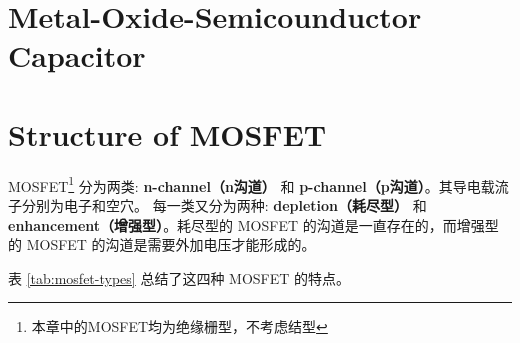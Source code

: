 \section[MOS]{Metal-Oxide-Semicounductor Capacitor}

\section{Structure of MOSFET}

MOSFET\footnote{本章中的MOSFET均为绝缘栅型，不考虑结型} 分为两类: \textbf{n-channel（n沟道）} 和 \textbf{p-channel（p沟道）}。其导电载流子分别为电子和空穴。
每一类又分为两种: \textbf{depletion（耗尽型）} 和 \textbf{enhancement（增强型）}。耗尽型的 MOSFET 的沟道是一直存在的，而增强型的 MOSFET 的沟道是需要外加电压才能形成的。

表 \ref{tab:mosfet-types} 总结了这四种 MOSFET 的特点。

